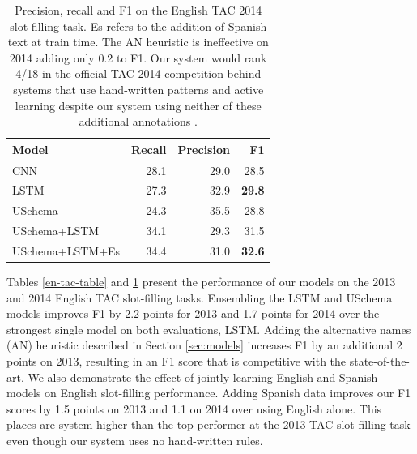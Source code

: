 \begin{table}[t!]
\begin{center}
\begin{tabular}{|lrrr|}
\hline
\bf Model & \bf Recall & \bf Precision & \bf F1 \\
\hline\hline
CNN                 & 28.1 & 29.0 & 28.5 \\
LSTM                & 27.3 & 32.9 & \bf 29.8  \\
USchema             & 24.3 & 35.5 & 28.8 \\
\hline\hline
USchema+LSTM        & 34.1 & 29.3 & 31.5 \\
USchema+LSTM+Es        & 34.4 & 31.0 & \bf 32.6 \\

\hline
\end{tabular}
\caption{Precision, recall and F1 on the English TAC 2014 slot-filling task. Es refers to the addition of Spanish text at train time. The AN heuristic is ineffective on 2014 adding only 0.2 to F1. Our system would rank 4/18 in the official TAC 2014 competition behind systems that use hand-written patterns and active learning despite our system using neither of these additional annotations \protect\citep{SurdeanuMihai2014}.\label{2014-en-tac-table}}
\end{center}
\vspace{-.4cm}
\end{table}

Tables \ref{en-tac-table} and \ref{2014-en-tac-table} present the performance of our models on the 2013 and 2014 English TAC slot-filling tasks. Ensembling the LSTM and USchema models improves F1 by 2.2 points for 2013 and 1.7 points for 2014 over the strongest single model on both evaluations, LSTM. Adding the alternative names (AN) heuristic described in Section \ref{sec:models} increases F1 by an additional 2 points on 2013, resulting in an F1 score that is competitive with the state-of-the-art. We also demonstrate the effect of jointly learning English and Spanish models on English slot-filling performance. Adding Spanish data improves our F1 scores by 1.5 points on 2013 and 1.1 on 2014 over using English alone. This places are system higher than the top performer at the 2013 TAC slot-filling task even though our system uses no hand-written rules.

